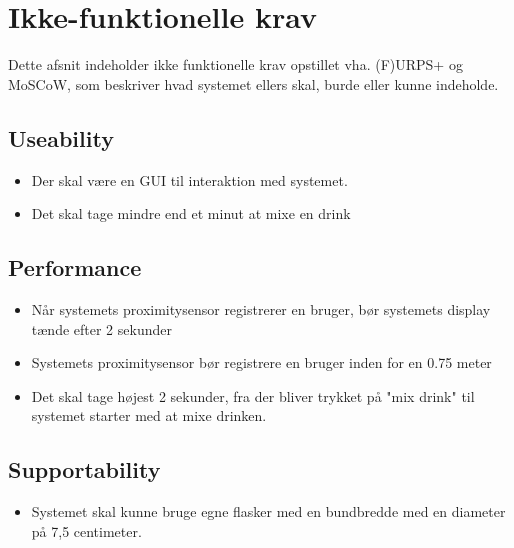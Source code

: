 \section{Ikke-funktionelle krav}
Dette afsnit indeholder ikke funktionelle krav opstillet vha. (F)URPS+ og MoSCoW, som beskriver hvad systemet ellers skal, burde eller kunne indeholde. 

\subsection{Useability}
\begin{itemize}
    \item Der skal være en GUI til interaktion med systemet. 
    \item Det skal tage mindre end et minut at mixe en drink
\end{itemize}

\subsection{Performance}
\begin{itemize}
    \item Når systemets proximitysensor registrerer en bruger, bør systemets display tænde efter 2 sekunder
    \item Systemets proximitysensor bør registrere en bruger inden for en 0.75 meter
    \item Det skal tage højest 2 sekunder, fra der bliver trykket på "mix drink" til systemet starter med at mixe drinken.
\end{itemize}

\subsection{Supportability}
\begin{itemize}
    \item Systemet skal kunne bruge egne flasker med en bundbredde med en diameter på 7,5 centimeter.
\end{itemize}